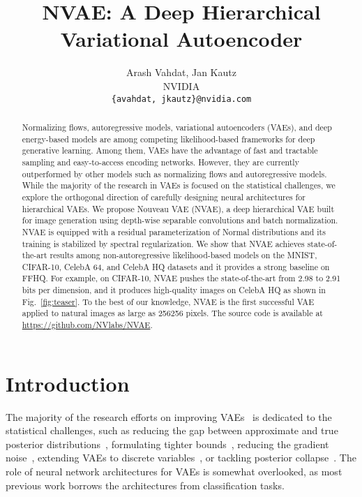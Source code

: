 \documentclass{article}
\title{NVAE: A Deep Hierarchical Variational Autoencoder }
\author{Arash Vahdat, Jan Kautz \\
  NVIDIA \\
  \texttt{\{avahdat,  jkautz\}@nvidia.com} \\
}
\begin{document}
\maketitle

\begin{abstract}
Normalizing flows, autoregressive models, variational autoencoders (VAEs), and deep energy-based models are among competing likelihood-based frameworks for deep generative learning. Among them, VAEs have the advantage of fast and tractable sampling and easy-to-access encoding networks. However, they are currently outperformed by other models such as normalizing flows and autoregressive models. While the majority of the research in VAEs is focused on the statistical challenges, we explore the orthogonal direction of carefully designing neural architectures for hierarchical VAEs. We propose Nouveau VAE (NVAE), a deep hierarchical VAE built for image generation using depth-wise separable convolutions and batch normalization. NVAE is equipped with a residual parameterization of Normal distributions and its training is stabilized by spectral regularization. We show that NVAE achieves state-of-the-art results among non-autoregressive likelihood-based models on the MNIST, CIFAR-10, CelebA 64, and CelebA HQ datasets and it provides a strong baseline on FFHQ. For example, on CIFAR-10, NVAE pushes the state-of-the-art from 2.98 to 2.91 bits per dimension, and it produces high-quality images on CelebA HQ as shown in Fig.~\ref{fig:teaser}. To the best of our knowledge, NVAE is the first successful VAE applied to natural images as large as 256256 pixels. The source code is available at {\color{blue}\url{https://github.com/NVlabs/NVAE}}.
 \end{abstract}
\section{Introduction}
The majority of the research efforts on improving VAEs~\cite{kingma2014vae, rezende2014stochastic} is dedicated to the statistical challenges, such as reducing the gap between approximate and true posterior distributions~\cite{rezendeICML15Normalizing, kingma2016improved, gregor2015draw, cremer18amortization, marino18amortized, maaloe16auxiliary, ranganath16hierarchical, vahdat2019UndirectedPost}, formulating tighter bounds~\cite{burda2015importance, li2016renyi, bornschein2016bidirectional, masrani2019thermodynamic}, reducing the gradient noise~\cite{roeder2017sticking, tucker2018doubly}, extending VAEs to discrete variables~\cite{maddison2016concrete, jang2016categorical, rolfe2016discrete, Vahdat2018DVAE++, vahdat2018dvaes, tucker2017rebar, grathwohl2017backpropagation}, or tackling posterior collapse~\cite{bowman2016generating, razavi2019collapse, gulrajani2016pixelvae,lucas2019collapse}. The role of neural network architectures for VAEs is somewhat overlooked, as most previous work borrows the architectures from classification tasks. 
\end{document}
